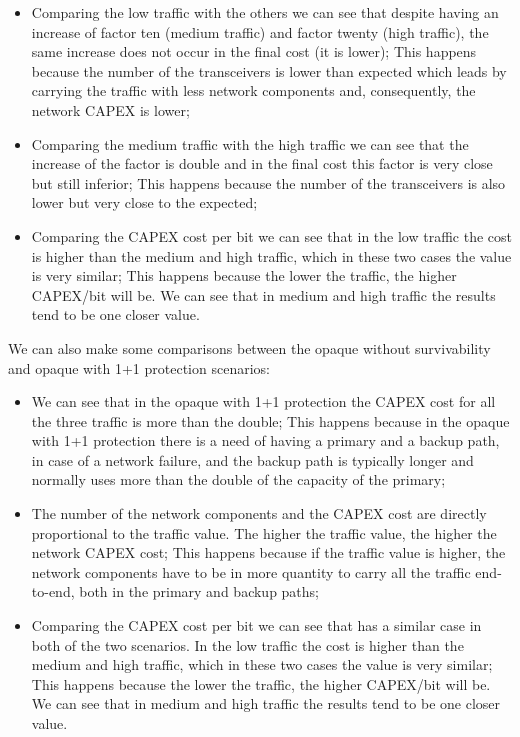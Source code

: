 \begin{itemize}
  \item Comparing the low traffic with the others we can see that despite having an increase of factor ten (medium traffic) and factor twenty (high traffic), the same increase does not occur in the final cost (it is lower);
  \subitem This happens because the number of the transceivers is lower than expected which leads by carrying the traffic with less network components and, consequently, the network CAPEX is lower;
  \item Comparing the medium traffic with the high traffic we can see that the increase of the factor is double and in the final cost this factor is very close but still inferior;
  \subitem This happens because the number of the transceivers is also lower but very close to the expected;
  \item Comparing the CAPEX cost per bit we can see that in the low traffic the cost is higher than the medium and high traffic, which in these two cases the value is very similar;
  \subitem This happens because the lower the traffic, the higher CAPEX/bit will be. We can see that in medium and high traffic the results tend to be one closer value.
\end{itemize}

We can also make some comparisons between the opaque without survivability and opaque with 1+1 protection scenarios:

\begin{itemize}
  \item We can see that in the opaque with 1+1 protection the CAPEX cost for all the three traffic is more than the double;
    \subitem This happens because in the opaque with 1+1 protection there is a need of having a primary and a backup path, in case of a network failure, and the backup path is typically longer and normally uses more than the double of the capacity of the primary;
  \item The number of the network components and the CAPEX cost are directly proportional to the traffic value. The higher the traffic value, the higher the network CAPEX cost;
  \subitem This happens because if the traffic value is higher, the network components have to be in more quantity to carry all the traffic end-to-end, both in the primary and backup paths;
  \item Comparing the CAPEX cost per bit we can see that has a similar case in both of the two scenarios. In the low traffic the cost is higher than the medium and high traffic, which in these two cases the value is very similar;
  \subitem This happens because the lower the traffic, the higher CAPEX/bit will be. We can see that in medium and high traffic the results tend to be one closer value.
\end{itemize}

